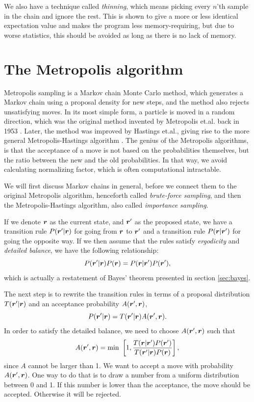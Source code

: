 We also have a technique called \textit{thinning}, which means picking every $n$'th sample in the chain and ignore the rest. This is shown to give a more or less identical expectation value and makes the program less memory-requiring, but due to worse statistics, this should be avoided as long as there is no lack of memory. 

\section{The Metropolis algorithm} \label{sec:metropolis}
Metropolis sampling is a Markov chain Monte Carlo method, which generates a Markov chain using a proposal density for new steps, and the method also rejects unsatisfying moves. In its most simple form, a particle is moved in a random direction, which was the original method invented by Metropolis et.al. back in 1953 \cite{metropolis_equation_1953}. Later, the method was improved by Hastings et.al., giving rise to the more general Metropolis-Hastings algorithm \cite{hastings_monte_1970}.
The genius of the Metropolis algorithms, is that the acceptance of a move is not based on the probabilities themselves, but the ratio between the new and the old probabilities. In that way, we avoid calculating normalizing factor, which is often computational intractable.

We will first discuss Markov chains in general, before we connect them to the original Metropolis algorithm, henceforth called \textit{brute-force sampling}, and then the Metropolis-Hastings algorithm, also called \textit{importance sampling}.

If we denote $\boldsymbol{{r}}$ as the current state, and $\boldsymbol{{r}}'$ as the proposed state, we have a transition rule $P(\boldsymbol{{r}}'|\boldsymbol{{r}})$ for going from $\boldsymbol{{r}}$ to $\boldsymbol{{r}}'$ and a transition rule $P(\boldsymbol{{r}}|\boldsymbol{{r}}')$ for going the opposite way. If we then assume that the rules satisfy \textit{ergodicity} and \textit{detailed balance}, we have the following relationship:
\begin{equation}
P(\boldsymbol{{r}}'|\boldsymbol{{r}})P(\boldsymbol{{r}})=P(\boldsymbol{{r}}|\boldsymbol{{r}}')P(\boldsymbol{{r}}'),
\end{equation}
which is actually a restatement of Bayes' theorem presented in section \ref{sec:bayes}.

The next step is to rewrite the transition rules in terms of a proposal distribution $T(\boldsymbol{{r}}'|\boldsymbol{{r}})$ and an acceptance probability $A(\boldsymbol{{r}}',\boldsymbol{{r}})$,
\begin{equation}
P(\boldsymbol{{r}}'|\boldsymbol{{r}})=T(\boldsymbol{{r}}'|\boldsymbol{{r}})A(\boldsymbol{{r}}',\boldsymbol{{r}}).
\end{equation}
In order to satisfy the detailed balance, we need to choose $A(\boldsymbol{{r}}',\boldsymbol{{r}})$ such that
\begin{equation}
A(\boldsymbol{{r}}',\boldsymbol{{r}})=\text{min }\left[1,\frac{T(\boldsymbol{{r}}|\boldsymbol{{r}}')P(\boldsymbol{{r}}')}{T(\boldsymbol{{r}}'|\boldsymbol{{r}})P(\boldsymbol{{r}})}\right],
\label{eq:acceptance}
\end{equation}
since $A$ cannot be larger than 1. We want to accept a move with probability $A(\boldsymbol{{r}}',\boldsymbol{{r}})$. One way to do that is to draw a number from a uniform distribution between 0 and 1. If this number is lower than the acceptance, the move should be accepted. Otherwise it will be rejected.

